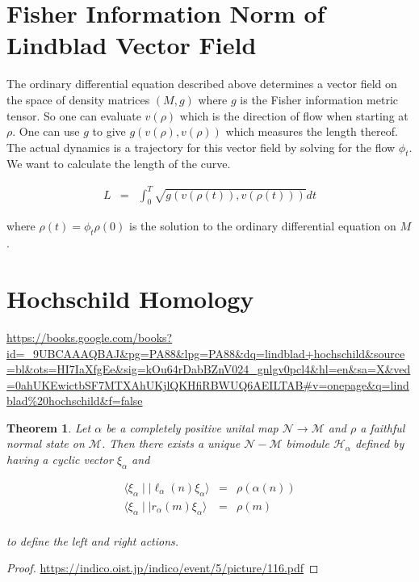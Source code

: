 \documentclass[11pt]{article}
\theoremstyle{change}
\newtheorem{theorem}[equation]{Theorem}
\theoremstyle{nonumberplain}
\newtheorem{proof}{Proof}
\numberwithin{equation}{section}
\newcommand\ket[1]{\mid #1 \rangle}
\newcommand\bra[1]{\langle #1 \mid}
\begin{document}
\section{Fisher Information Norm of Lindblad Vector Field}

The ordinary differential equation described above determines a vector field on the space of density matrices $(M,g)$ where $g$ is the Fisher information metric tensor. So one can evaluate $v (\rho)$ which is the direction of flow when starting at $\rho$. One can use $g$ to give $g (v (\rho) , v(\rho) )$ which measures the length thereof. The actual dynamics is a trajectory for this vector field by solving for the flow $\phi_t$. We want to calculate the length of the curve.

\begin{eqnarray*}
L &=& \int_0^T \sqrt{g (v (\rho (t) ) , v(\rho (t) ) )} dt
\end{eqnarray*}

where $\rho (t) = \phi_t \rho (0)$ is the solution to the ordinary differential equation on $M$.

\section{Hochschild Homology}

\url{https://books.google.com/books?id=_9UBCAAAQBAJ&pg=PA88&lpg=PA88&dq=lindblad+hochschild&source=bl&ots=HI7IaXfgEe&sig=kOu64rDabBZnV024_gnlgv0pcl4&hl=en&sa=X&ved=0ahUKEwictbSF7MTXAhUKjlQKHfiRBWUQ6AEILTAB#v=onepage&q=lindblad\%20hochschild&f=false}

\begin{theorem}
Let $\alpha$ be a completely positive unital map $\mathcal{N} \to \mathcal{M}$ and $\rho$ a faithful normal state on $\mathcal{M}$. Then there exists a unique $\mathcal{N} - \mathcal{M}$ bimodule $\mathcal{H}_\alpha$ defined by having a cyclic vector $\xi_\alpha$ and

\begin{eqnarray*}
\bra{\xi_\alpha} \ket{ \ell_\alpha (n) \xi_\alpha} &=& \rho ( \alpha (n))\\
\bra{\xi_\alpha} \ket{ r_\alpha (m) \xi_\alpha} &=& \rho ( m)\\
\end{eqnarray*}

to define the left and right actions.

\end{theorem}

\begin{proof}
\url{https://indico.oist.jp/indico/event/5/picture/116.pdf}
\end{proof}
\end{document}
